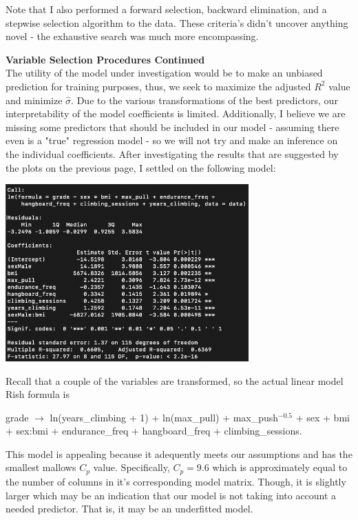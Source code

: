 \documentclass[11pt]{amsart}
\newcommand{\adj}{\rightarrow}
\begin{document}
Note that I also performed a forward selection, backward elimination, and a stepwise selection algorithm to the data. 
These criteria's didn't uncover anything novel - the exhaustive search was much more encompassing.


\newpage
{\bf\large Variable Selection Procedures Continued}\\
The utility of the model under investigation would be to make an unbiased prediction for training purposes, thus, we seek to maximize the adjusted $R^2$ value and minimize $\hat\sigma$.
Due to the various transformations of the best predictors, our interpretability of the model coefficients is limited.
Additionally, I believe we are missing some predictors that should be included in our model - assuming there even is a "true" regression model - so we will not try and make an inference on the individual coefficients.
After investigating the results that are suggested by the plots on the previous page, I settled on the following model:\\

\begin{center}
\includegraphics[width=0.7\textwidth]{summary}\\
\end{center}

Recall that a couple of the variables are transformed, so the actual linear model Rish formula is\\

\begin{center}
grade $\adj$ ln(years\_climbing + 1) + ln(max\_pull) + max\_push$^{-0.5}$ + sex + bmi + sex:bmi + endurance\_freq + hangboard\_freq + climbing\_sessions.\\
\end{center}




This model is appealing because it adequently meets our assumptions and has the smallest 
mallows $C_p$ value. Specifically, $C_p=9.6$ which is approximately equal to the number of columns in it's corresponding model matrix.
Though, it is slightly larger which may be an indication that our model is not taking into account a needed predictor.
That is, it may be an underfitted model.\\
\end{document}
